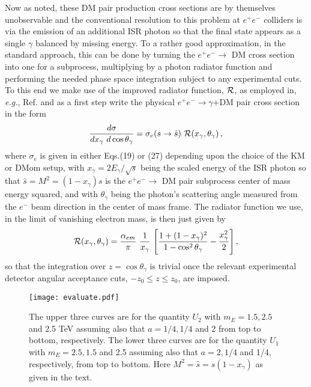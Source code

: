 \documentclass[14pt]{article}
\def\eg{{\it e.g.}}
\def\to{\rightarrow}
\begin{document}
{Now as noted, these DM pair production cross sections are by themselves unobservable and the conventional resolution to this problem at $e^+e^-$ colliders is via the emission of an additional ISR 
photon so that the final state appears as a single $\gamma$ balanced by missing energy. To a rather good approximation, in the standard approach, this can be done by turning the $e^+e^-\to$ DM 
cross section into one for a subprocess, multiplying by a photon radiator function and performing the needed phase space integration subject to any experimental cuts. To this end we make use 
of the improved radiator function, ${\cal R}$, as employed in, \eg, Ref.\cite{Chu:2018qrm,Choi:2015zka} and as a first step write the physical $e^+e^-\to \gamma$+DM pair cross section in the form
%
\begin{equation}
\frac{d\sigma}{dx_\gamma~d\cos \theta_\gamma}=\sigma_e(s\to \hat s)~{\cal R}(x_\gamma,\theta_\gamma)\,,  
\end{equation}
%
where $\sigma_e$ is given in either Eqs.(19) or (27) depending upon the choice of the KM or DMom setup, with $x_\gamma=2E_\gamma/\sqrt s$ being the scaled energy of the ISR photon so 
that $\hat s=M^2=(1-x_\gamma)s$ is the $e^+e^-\to$ DM pair subprocess center of mass energy squared, and with $\theta_\gamma$ being the photon's scattering angle measured from the $e^-$ 
beam direction in the center of mass frame. The radiator function we use, in the limit of vanishing electron mass, is then just given by\cite{Chu:2018qrm,Choi:2015zka}
%
\begin{equation}
{\cal R}(x_\gamma,\theta_\gamma)=\frac{\alpha_{em}}{\pi}~\frac{1}{x_\gamma}~\Bigg[\frac{1+(1-x_\gamma)^2}{1-\cos^2 \theta_\gamma}-\frac{x_\gamma^2}{2}\Bigg]\,,  
\end{equation}
%
so that the integration over $z=\cos \theta_\gamma$ is trivial once the relevant experimental detector angular acceptance cuts, $-z_0\leq z\leq z_0$, are imposed.

%
\begin{figure}[htbp]
\centerline{\texttt{[image: evaluate.pdf]}}
\vspace*{-1.3cm}
\caption{The upper three curves are for the quantity $U_2$ with $m_E=1.5,2.5$ and 2.5 TeV assuming also that $a=1/4,1/4$ and 2 from top to bottom, respectively. The lower three curves are for the 
quantity $U_1$ with $m_E=2.5,1.5$ and 2.5 assuming also that $a=2,1/4$ and 1/4, respectively, from top to bottom. Here $M^2=\hat s=s(1-x_\gamma)$ as given in the text.}
\label{fig6}
\end{figure}
%

}
\end{document}
